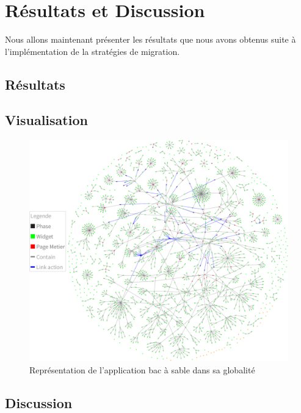 \documentclass[11pt,]{article}
\begin{document}
\newpage

\hypertarget{ruxe9sultats-et-discussion}{%
\section{Résultats et Discussion}\label{ruxe9sultats-et-discussion}}

Nous allons maintenant présenter les résultats que nous avons obtenus
suite à l'implémentation de la stratégies de migration.

\hypertarget{ruxe9sultats}{%
\subsection{Résultats}\label{ruxe9sultats}}

\hypertarget{visualisation}{%
\subsection{Visualisation}\label{visualisation}}

\hypertarget{firework}{%
\begin{figure}
\centering
\includegraphics[width=1\textwidth,height=\textheight]{figures/firework.png}
\caption{Représentation de l'application bac à sable dans sa
globalité}\label{firework}
\end{figure}
}

\hypertarget{discussion}{%
\subsection{Discussion}\label{discussion}}
\end{document}
